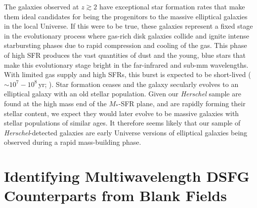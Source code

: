 The galaxies observed at $z \gtrsim 2$ have exceptional star formation rates that make them ideal candidates for being the progenitors to the massive elliptical galaxies in the local Universe. If this were to be true, these galaxies represent a fixed stage in the evolutionary process where gas-rich disk galaxies collide and ignite intense starbursting phases due to rapid compression and cooling of the gas. This phase of high SFR produces the vast quantities of dust and the young, blue stars that make this evolutionary stage bright in the far-infrared and sub-mm wavelengths. With limited gas supply and high SFRs, this burst is expected to be short-lived ($\sim 10^7 - 10^8\,$yr; \citealt{Greve_2005, Tacconi_2006, Hickox_2012}). Star formation ceases and the galaxy secularly evolves to an elliptical galaxy with an old stellar population. Given our \textit{Herschel} sample are found at the high mass end of the $M_*$-SFR plane, and are rapidly forming their stellar content, we expect they would later evolve to be massive galaxies with stellar populations of similar ages. It therefore seems likely that our sample of \textit{Herschel}-detected galaxies are early Universe versions of elliptical galaxies being observed during a rapid mass-building phase.

\section{Identifying Multiwavelength DSFG Counterparts from Blank Fields}

